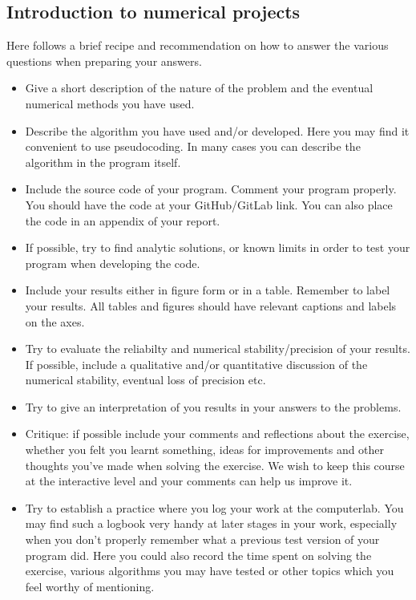 \documentclass[%
oneside,                 %
final,                   %
10pt]{article}
\begin{document}
\noindent
\subsection{Introduction to numerical projects}

Here follows a brief recipe and recommendation on how to answer the various questions when preparing your answers. 

\begin{itemize}
  \item Give a short description of the nature of the problem and the eventual  numerical methods you have used.

  \item Describe the algorithm you have used and/or developed. Here you may find it convenient to use pseudocoding. In many cases you can describe the algorithm in the program itself.

  \item Include the source code of your program. Comment your program properly. You should have the code at your GitHub/GitLab link. You can also place the code in an appendix of your report.

  \item If possible, try to find analytic solutions, or known limits in order to test your program when developing the code.

  \item Include your results either in figure form or in a table. Remember to        label your results. All tables and figures should have relevant captions        and labels on the axes.

  \item Try to evaluate the reliabilty and numerical stability/precision of your results. If possible, include a qualitative and/or quantitative discussion of the numerical stability, eventual loss of precision etc.

  \item Try to give an interpretation of you results in your answers to  the problems.

  \item Critique: if possible include your comments and reflections about the  exercise, whether you felt you learnt something, ideas for improvements and  other thoughts you've made when solving the exercise. We wish to keep this course at the interactive level and your comments can help us improve it.

  \item Try to establish a practice where you log your work at the  computerlab. You may find such a logbook very handy at later stages in your work, especially when you don't properly remember  what a previous test version  of your program did. Here you could also record  the time spent on solving the exercise, various algorithms you may have tested or other topics which you feel worthy of mentioning.
\end{itemize}
\end{document}
